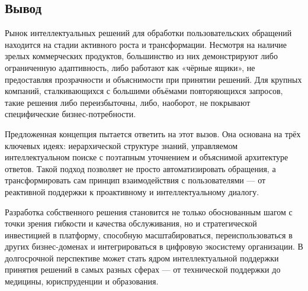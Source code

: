 \subsection{Вывод}

Рынок интеллектуальных решений для обработки пользовательских обращений находится на стадии активного роста и трансформации. Несмотря на наличие зрелых коммерческих продуктов, большинство из них демонстрируют либо ограниченную адаптивность, либо работают как «чёрные ящики», не предоставляя прозрачности и объяснимости при принятии решений. Для крупных компаний, сталкивающихся с большими объёмами повторяющихся запросов, такие решения либо переизбыточны, либо, наоборот, не покрывают специфические бизнес-потребности.

Предложенная концепция пытается ответить на этот вызов. Она основана на трёх ключевых идеях: иерархической структуре знаний, управляемом интеллектуальном поиске с поэтапным уточнением и объяснимой архитектуре ответов. Такой подход позволяет не просто автоматизировать обращения, а трансформировать сам принцип взаимодействия с пользователями — от реактивной поддержки к проактивному и интеллектуальному диалогу.

Разработка собственного решения становится не только обоснованным шагом с точки зрения гибкости и качества обслуживания, но и стратегической инвестицией в платформу, способную масштабироваться, переиспользоваться в других бизнес-доменах и интегрироваться в цифровую экосистему организации. В долгосрочной перспективе может стать ядром интеллектуальной поддержки принятия решений в самых разных сферах — от технической поддержки до медицины, юриспруденции и образования.
